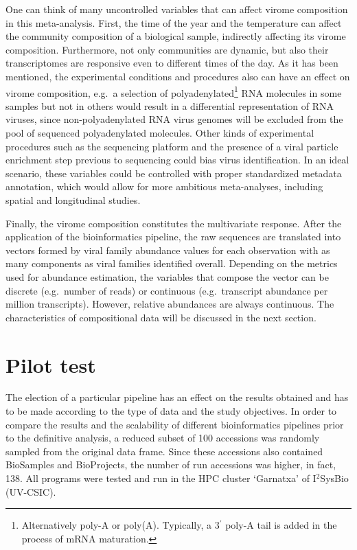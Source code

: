 \documentclass[
  openany]{book}
\begin{document}
One can think of many uncontrolled variables that can affect virome composition in this meta-analysis. First, the time of the year and the temperature can affect the community composition of a biological sample, indirectly affecting its virome composition. Furthermore, not only communities are dynamic, but also their transcriptomes are responsive even to different times of the day. As it has been mentioned, the experimental conditions and procedures also can have an effect on virome composition, e.g.~a selection of polyadenylated\footnote{Alternatively poly-A or poly(A). Typically, a 3\(^\prime\) poly-A tail is added in the process of mRNA maturation.} RNA molecules in some samples but not in others would result in a differential representation of RNA viruses, since non-polyadenylated RNA virus genomes will be excluded from the pool of sequenced polyadenylated molecules. Other kinds of experimental procedures such as the sequencing platform and the presence of a viral particle enrichment step previous to sequencing could bias virus identification. In an ideal scenario, these variables could be controlled with proper standardized metadata annotation, which would allow for more ambitious meta-analyses, including spatial and longitudinal studies.

Finally, the virome composition constitutes the multivariate response. After the application of the bioinformatics pipeline, the raw sequences are translated into vectors formed by viral family abundance values for each observation with as many components as viral families identified overall. Depending on the metrics used for abundance estimation, the variables that compose the vector can be discrete (e.g.~number of reads) or continuous (e.g.~transcript abundance per million transcripts). However, relative abundances are always continuous. The characteristics of compositional data will be discussed in the next section.

\hypertarget{pilot-test}{%
\chapter{Pilot test}\label{pilot-test}}

The election of a particular pipeline has an effect on the results obtained and has to be made according to the type of data and the study objectives. In order to compare the results and the scalability of different bioinformatics pipelines prior to the definitive analysis, a reduced subset of 100 accessions was randomly sampled from the original data frame. Since these accessions also contained BioSamples and BioProjects, the number of run accessions was higher, in fact, 138. All programs were tested and run in the HPC cluster `Garnatxa' of I\(^2\)SysBio (UV-CSIC).
\end{document}
